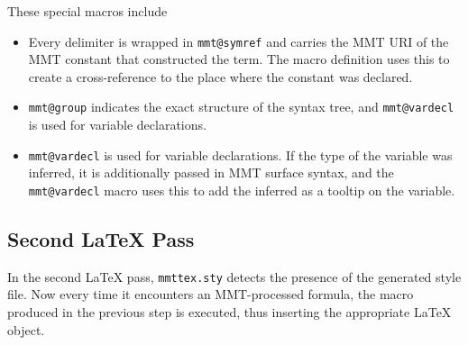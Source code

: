 \documentclass{article}
\begin{document}
These special macros include
\begin{itemize}
 \item Every delimiter is wrapped in \lstinline|mmt@symref| and carries the MMT URI of the MMT constant that constructed the term.
 The macro definition uses this to create a cross-reference to the place where the constant was declared.
 \item \lstinline|mmt@group| indicates the exact structure of the syntax tree, and \lstinline|mmt@vardecl| is used for variable declarations.
 \item \lstinline|mmt@vardecl| is used for variable declarations. If the type of the variable was inferred, it is additionally passed in MMT surface syntax, and the \lstinline|mmt@vardecl| macro uses this to add the inferred as a tooltip on the variable.
\end{itemize}

\subsection{Second LaTeX Pass}

In the second LaTeX pass, \lstinline|mmttex.sty| detects the presence of the generated style file.
Now every time it encounters an MMT-processed formula, the macro produced in the previous step is executed, thus inserting the appropriate LaTeX object.

%
%
%
%
%
%
%
%
%
\end{document}
